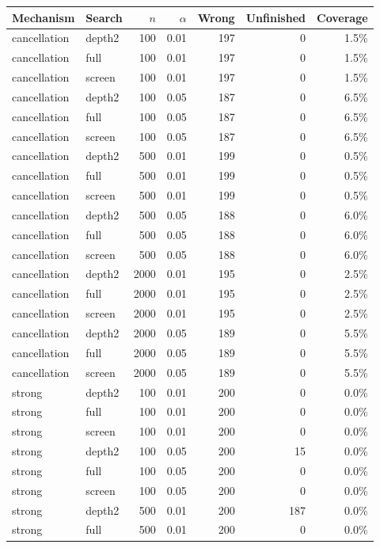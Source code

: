 \begin{longtable}{llrrrrr}
\toprule
Mechanism & Search & $n$ & $\alpha$ & Wrong & Unfinished & Coverage\\
\midrule\endhead
cancellation & depth2 & 100 & 0.01 & 197 & 0 & 1.5\%\\
cancellation & full & 100 & 0.01 & 197 & 0 & 1.5\%\\
cancellation & screen & 100 & 0.01 & 197 & 0 & 1.5\%\\
cancellation & depth2 & 100 & 0.05 & 187 & 0 & 6.5\%\\
cancellation & full & 100 & 0.05 & 187 & 0 & 6.5\%\\
cancellation & screen & 100 & 0.05 & 187 & 0 & 6.5\%\\
cancellation & depth2 & 500 & 0.01 & 199 & 0 & 0.5\%\\
cancellation & full & 500 & 0.01 & 199 & 0 & 0.5\%\\
cancellation & screen & 500 & 0.01 & 199 & 0 & 0.5\%\\
cancellation & depth2 & 500 & 0.05 & 188 & 0 & 6.0\%\\
cancellation & full & 500 & 0.05 & 188 & 0 & 6.0\%\\
cancellation & screen & 500 & 0.05 & 188 & 0 & 6.0\%\\
cancellation & depth2 & 2000 & 0.01 & 195 & 0 & 2.5\%\\
cancellation & full & 2000 & 0.01 & 195 & 0 & 2.5\%\\
cancellation & screen & 2000 & 0.01 & 195 & 0 & 2.5\%\\
cancellation & depth2 & 2000 & 0.05 & 189 & 0 & 5.5\%\\
cancellation & full & 2000 & 0.05 & 189 & 0 & 5.5\%\\
cancellation & screen & 2000 & 0.05 & 189 & 0 & 5.5\%\\
strong & depth2 & 100 & 0.01 & 200 & 0 & 0.0\%\\
strong & full & 100 & 0.01 & 200 & 0 & 0.0\%\\
strong & screen & 100 & 0.01 & 200 & 0 & 0.0\%\\
strong & depth2 & 100 & 0.05 & 200 & 15 & 0.0\%\\
strong & full & 100 & 0.05 & 200 & 0 & 0.0\%\\
strong & screen & 100 & 0.05 & 200 & 0 & 0.0\%\\
strong & depth2 & 500 & 0.01 & 200 & 187 & 0.0\%\\
strong & full & 500 & 0.01 & 200 & 0 & 0.0\%\\

\end{longtable}

